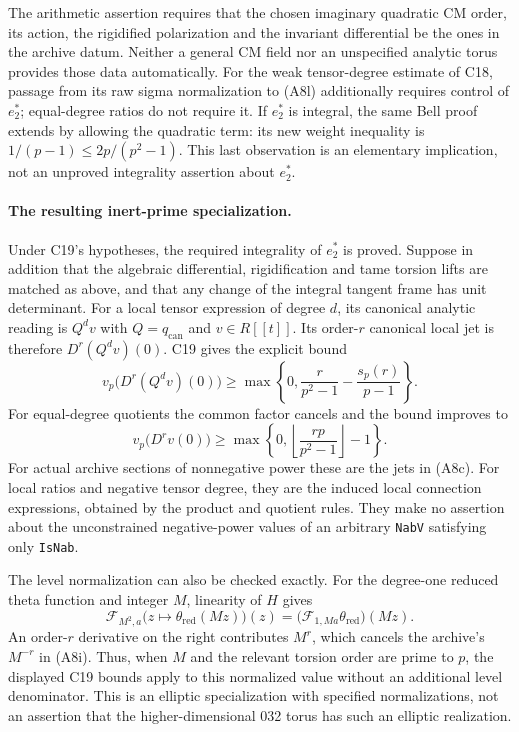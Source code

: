 The arithmetic assertion requires that the chosen imaginary
quadratic CM order, its action, the rigidified polarization and
the invariant differential be the ones in the archive datum.
Neither a general CM field nor an unspecified analytic torus
provides those data automatically.  For the weak tensor-degree
estimate of C18, passage from its raw sigma normalization to
(A8l) additionally requires control of $e_2^*$; equal-degree
ratios do not require it.  If $e_2^*$ is integral, the same Bell
proof extends by allowing the quadratic term: its new weight
inequality is $1/(p-1)\leq2p/(p^2-1)$.  This last observation is
an elementary implication, not an unproved integrality assertion
about $e_2^*$.

\paragraph{The resulting inert-prime specialization.}
Under C19's hypotheses, the required integrality of $e_2^*$ is
proved.  Suppose in addition that the algebraic differential,
rigidification and tame torsion lifts are matched as above, and
that any change of the integral tangent frame has unit determinant.
For a local tensor expression of degree $d$, its canonical
analytic reading is $Q^dv$ with $Q=q_{\mathrm{can}}$ and
$v\in R[[t]]$.  Its order-$r$ canonical local jet is therefore
$D^r(Q^dv)(0)$.  C19 gives the explicit bound
\[
 v_p\bigl(D^r(Q^dv)(0)\bigr)
 \geq\max\left\{0,\frac{r}{p^2-1}
                         -\frac{s_p(r)}{p-1}\right\}.
\]
For equal-degree quotients the common factor cancels and the
bound improves to
\[
 v_p\bigl(D^rv(0)\bigr)
 \geq\max\left\{0,
          \left\lfloor\frac{rp}{p^2-1}\right\rfloor-1\right\}.
\]
For actual archive sections of nonnegative power these are the
jets in (A8c).  For local ratios and negative tensor degree, they
are the induced local connection expressions, obtained by the
product and quotient rules.  They make no assertion about the
unconstrained negative-power values of an arbitrary
\texttt{NabV} satisfying only \texttt{IsNab}.

The level normalization can also be checked exactly.  For the
degree-one reduced theta function and integer $M$, linearity of
$H$ gives
\[
 \mathcal F_{M^2,a}\bigl(z\mapsto\theta_{\mathrm{red}}(Mz)\bigr)(z)
      =\bigl(\mathcal F_{1,Ma}\theta_{\mathrm{red}}\bigr)(Mz).
\]
An order-$r$ derivative on the right contributes $M^r$, which
cancels the archive's $M^{-r}$ in (A8i).  Thus, when $M$ and the
relevant torsion order are prime to $p$, the displayed C19 bounds
apply to this normalized value without an additional level
denominator.  This is an elliptic specialization with specified
normalizations, not an assertion that the higher-dimensional
032 torus has such an elliptic realization.

